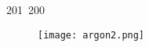 201~200~\documentclass{article}
\begin{document}
	                                                                                                                                                                                                                                                                                                	                                                                                                                                        	    	                                                                                                	                                                                                                                                                                                                                                                                                                                                	                                                                        	                                                                        	                                                    \begin{figure}[h]
	                                                                                                                                                                                                                                                                                                	                                                                                                                                        	    	                                                                                                	                                                                                                                                                                                                                                                                                                                                	                                                                        	                                                                        	                                                        \centering
	                                                                                                                                                                                                                                                                                                	                                                                                                                                        	    	                                                                                                	                                                                                                                                                                                                                                                                                                                                	                                                                        	                                                                        	                                                            \texttt{[image: argon2.png]}

\end{figure}
\end{document}
